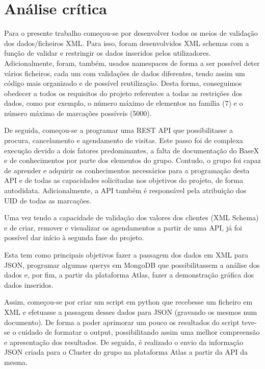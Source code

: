 \documentclass{article}
\begin{document}
\newpage
\section{Análise crítica}

\hspace{0.5cm} Para o presente trabalho começou-se por desenvolver todos os meios de validação dos dados/ficheiros XML. Para isso, foram desenvolvidos XML schemas com a função de validar e restringir os dados inseridos pelos utilizadores. Adicionalmente, foram, também, usados namespaces de forma a ser possível deter vários ficheiros, cada um com validações de dados diferentes, tendo assim um código mais organizado e de possível reutilização. Desta forma, conseguimos obedecer a todos os requisitos do projeto referentes a todas as restrições dos dados, como por exemplo, o número máximo de elementos na família (7) e o número máximo de marcações possíveis (5000). \par
De seguida, começou-se a programar uma REST API que possibilitasse a procura, cancelamento e agendamento de visitas. Este passo foi de complexa execução devido a dois fatores predominantes, a falta de documentação do BaseX e de conhecimentos por parte dos elementos do grupo. Contudo, o grupo foi capaz de aprender e adquirir os conhecimentos necessários para a programação desta API e de todas as capacidades solicitadas nos objetivos do projeto, de forma autodidata. Adicionalmente, a API também é responsável pela atribuição dos UID de todas as marcações.\par
Uma vez tendo a capacidade de validação dos valores dos clientes (XML Schema) e de criar, remover e visualizar os agendamentos a partir de uma API, já foi possível dar início à segunda fase do projeto. \par
Esta tem como principais objetivos fazer a passagem dos dados em XML para JSON, programar algumas querys em MongoDB que possibilitassem a análise dos dados e, por fim, a partir da plataforma Atlas, fazer a demonstração gráfica dos dados inseridos. \par
Assim, começou-se por criar um script em python que recebesse um ficheiro em XML e efetuasse a passagem desses dados para JSON (gravando os mesmos num documento). De forma a poder aprimorar um pouco os resultados do script teve-se o cuidado de formatar o output, possibilitando assim uma melhor compreensão e apresentação dos resultados. De seguida, é realizado o envio da informação JSON criada para o Cluster do grupo na plataforma Atlas a partir da API da mesma. \par
\end{document}
